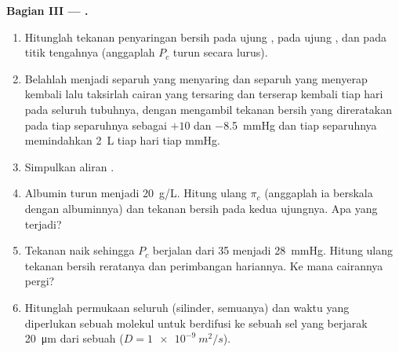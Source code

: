 \begin{problem}
\medskip
\noindent\textbf{Bagian III --- .}
\begin{enumerate}[resume]
  \item Hitunglah tekanan penyaringan bersih pada ujung ,
        pada ujung , dan pada titik tengahnya (anggaplah $P_c$
        turun secara lurus).
  \item Belahlah  menjadi separuh yang menyaring dan separuh
        yang menyerap kembali lalu taksirlah cairan yang tersaring dan
        terserap kembali tiap hari pada seluruh tubuhnya, dengan
        mengambil tekanan bersih yang direratakan pada tiap separuhnya
        sebagai $+10$ dan \qty{-8.5}{mmHg} dan tiap separuhnya
        memindahkan \qty{2}{L} tiap hari tiap mmHg.
  \item Simpulkan aliran .
  \item Albumin  turun menjadi \qty{20}{g/L}. Hitung ulang
        $\pi_c$ (anggaplah ia berskala dengan albuminnya) dan tekanan
        bersih pada kedua ujungnya. Apa yang terjadi?
  \item Tekanan  naik sehingga $P_c$ berjalan dari 35 menjadi
        \qty{28}{mmHg}. Hitung ulang tekanan bersih reratanya dan
        perimbangan hariannya. Ke mana cairannya pergi?
  \item Hitunglah permukaan seluruh  (silinder, semuanya) dan
        waktu yang diperlukan sebuah molekul untuk berdifusi ke sebuah
        sel yang berjarak \qty{20}{\micro m} dari sebuah  ($D = \qty{1e-9}{m^2/s}$).
\end{enumerate}


\end{problem}
